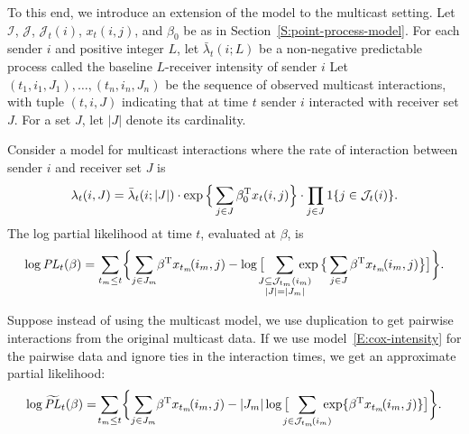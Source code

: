 \documentclass[aoas,preprint]{imsart}
\begin{document}
To this end, we introduce an extension of the model to the multicast setting.
Let $\mathcal{I}$, $\mathcal{J}$, $\mathcal{J}_t(i)$, $x_t(i,j)$,
and $\beta_0$ be as in Section~\ref{S:point-process-model}.  For each sender 
$i$ and positive integer $L$, let $\bar \lambda_t(i ; L)$ be a non-negative 
predictable process called the baseline $L$-receiver intensity of sender $i$
Let $(t_1, i_1, J_1), \ldots, (t_n, i_n, J_n)$ be the 
sequence of observed multicast interactions, with tuple $(t, i, J)$ indicating 
that at  time $t$ sender $i$ interacted with receiver set $J$.  For a set
$J$, let $|J|$ denote its cardinality.

Consider a model for multicast interactions where the rate of interaction
between sender $i$ and receiver set $J$ is
\begin{equation}\label{E:intensity-multiple}
    \lambda_t(i,J)
        =
        \bar \lambda_t(i ; |J|)
        \cdot
        \exp\Big\{
            \sum_{j \in J}
                \beta_0^\trans  x_t(i,j)
        \Big\}
        \cdot
        \prod_{j \in J}
        1\{ j \in \mathcal{J}_t(i) \}.
\end{equation}
The log partial likelihood at time $t$, evaluated at $\beta$, is
\begin{equation}\label{E:log-pl-multiple}
    \log
    \mathit{PL}_t(\beta)
        =
        \sum_{t_m \leq t}\!
        \bigg\{\!
            \sum_{j \in J_m}\!
                \beta^\trans x_{t_m}\!(i_m, j)
            -
            \log\big[
                \!\!\!\!
                \sum_{\substack{J \subseteq \mathcal{J}_{t_m}(i_m) \\
                               |J| = |J_m|}}\!\!\!\!\!\!\!
                    \exp\big\{
                        \sum_{j \in J}
                            \beta^\trans x_{t_m}\!(i_m, j)
                    \big\}
            \big]
        \bigg\}.
\end{equation}

Suppose instead of using the multicast model, we use duplication to get
pairwise interactions from the original multicast data.  If we use
model~\eqref{E:cox-intensity} for the pairwise data and ignore ties in
the interaction times, we get an approximate partial likelihood:
\begin{equation}\label{E:log-pl-multiple-approx}
    \log
    \widetilde{\mathit{PL}}_t(\beta)
        =\!
        \sum_{t_m \leq t}\!
        \bigg\{\!
            \sum_{j \in J_m}\!
                \beta^\trans x_{t_m}\!(i_m, j)
            -
            |J_m|
            \log\big[
                \!\!\!\!
                \sum_{j \in \mathcal{J}_{t_m}\!(i_m)}\!\!\!\!\!
                    \exp\{ \beta^\trans x_{t_m}\!(i_m, j)\}
            \big]
        \bigg\}.
\end{equation}
\end{document}
